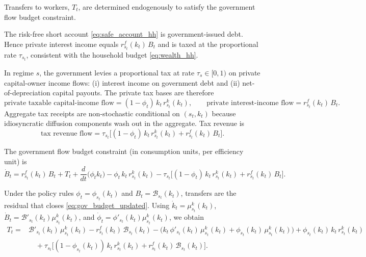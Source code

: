 \documentclass{article}
\begin{document}
Transfers to workers, $T_t$, are determined endogenously to satisfy the government flow budget constraint.

The risk-free short account \eqref{eq:safe_account_hh} is government-issued debt. Hence private interest income equals $r^f_{s_t}(k_t)\,B_t$
and is taxed at the proportional rate $\tau_{s_t}$, consistent with the household budget \eqref{eq:wealth_hh}.

In regime $s$, the government levies a proportional tax at rate $\tau_s\in[0,1)$ on private capital-owner income flows:
(i) interest income on government debt and (ii) net-of-depreciation capital payouts. The private tax bases are therefore
\begin{equation}\label{eq:gov_tax_bases_updated}
\text{private taxable capital-income flow} = (1-\phi_t)\,k_t\,r^k_{s_t}(k_t),
\qquad
\text{private interest-income flow} = r^f_{s_t}(k_t)\,B_t.
\end{equation}
Aggregate tax receipts are non-stochastic conditional on $(s_t,k_t)$ because idiosyncratic diffusion components wash out in the aggregate.
Tax revenue is
\begin{equation}\label{eq:gov_tax_revenue_updated}
\text{tax revenue flow}
=
\tau_{s_t}\Big[(1-\phi_t)\,k_t\,r^k_{s_t}(k_t) + r^f_{s_t}(k_t)\,B_t\Big].
\end{equation}

The government flow budget constraint (in consumption units, per efficiency unit) is
\begin{equation}\label{eq:gov_budget_updated}
\dot B_t
=
r^f_{s_t}(k_t)\,B_t
+ T_t
+ \frac{d}{dt}\big(\phi_t k_t\big)
- \phi_t\,k_t\,r^k_{s_t}(k_t)
- \tau_{s_t}\Big[(1-\phi_t)\,k_t\,r^k_{s_t}(k_t) + r^f_{s_t}(k_t)\,B_t\Big].
\end{equation}

Under the policy rules $\phi_t=\phi_{s_t}(k_t)$ and $B_t=\mathcal B_{s_t}(k_t)$, transfers are the residual that closes \eqref{eq:gov_budget_updated}.
Using $\dot k_t=\mu^k_{s_t}(k_t)$, $\dot B_t=\mathcal B'_{s_t}(k_t)\mu^k_{s_t}(k_t)$, and $\dot\phi_t=\phi'_{s_t}(k_t)\mu^k_{s_t}(k_t)$, we obtain
\begin{equation}\label{eq:gov_transfers_updated}
\begin{aligned}
T_t
={}& \mathcal B'_{s_t}(k_t)\,\mu^k_{s_t}(k_t)
- r^f_{s_t}(k_t)\,\mathcal B_{s_t}(k_t)
- \Big(k_t\,\phi'_{s_t}(k_t)\,\mu^k_{s_t}(k_t) + \phi_{s_t}(k_t)\,\mu^k_{s_t}(k_t)\Big)
+ \phi_{s_t}(k_t)\,k_t\,r^k_{s_t}(k_t) \\
&\quad
+ \tau_{s_t}\Big[(1-\phi_{s_t}(k_t))\,k_t\,r^k_{s_t}(k_t) + r^f_{s_t}(k_t)\,\mathcal B_{s_t}(k_t)\Big].
\end{aligned}
\end{equation}
\end{document}
